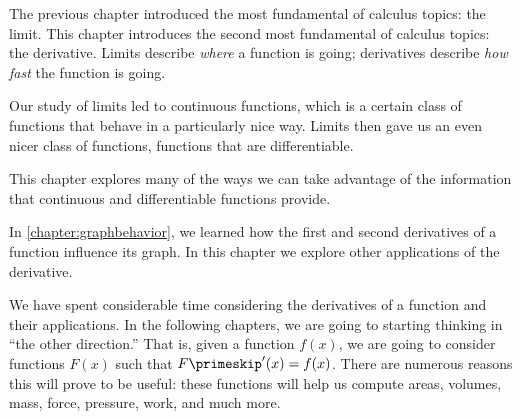 








The previous chapter introduced the most fundamental of calculus topics: the limit. This chapter introduces the second most fundamental of calculus topics: the derivative. Limits describe \textit{where} a function is going; derivatives describe \textit{how fast} the function is going.










Our study of limits led to continuous functions, which is a certain class of functions that behave in a particularly nice way. Limits then gave us an even nicer class of functions, functions that are differentiable.

This chapter explores many of the ways we can take advantage of the information that continuous and differentiable functions  provide.









In \autoref{chapter:graphbehavior}, we learned how the first and second derivatives of a function influence its graph. In this chapter we explore other applications of the derivative.








We have spent considerable time considering the derivatives of a function and their applications. In the following chapters, we are going to starting thinking in ``the other direction.'' That is, given a function $f(x)$, we are going to consider functions $F(x)$ such that $F\primeskip'(x) = f(x)$. There are numerous reasons this will prove to be useful: these functions will help us compute areas, volumes, mass, force, pressure, work, and much more.

